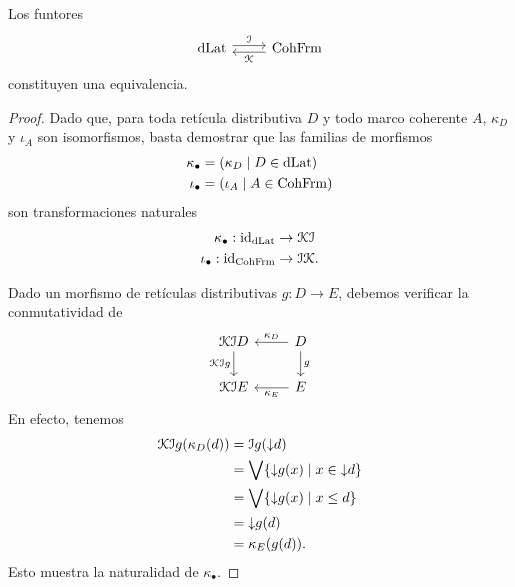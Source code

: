 \begin{theorem}
    Los funtores
    \[
        \begin{tikzcd}
            \DLat \ar[r,"\cal I",shift left] &
            \CohFrm \ar[l,"\cal K",shift left]
        \end{tikzcd}
    \]
    constituyen una equivalencia.
\end{theorem}
\begin{proof}
    Dado que, para toda retícula distributiva $D$
    y todo marco coherente $A$,  $\kappa_D$ y $\iota_A$
    son isomorfismos, basta demostrar que las familias
    de morfismos
    \begin{align*}
        \kappa_\bullet &= (\kappa_D\mid D\in\mathrm{dLat}) \\
        \iota_\bullet &= (\iota_A\mid A\in\mathrm{CohFrm})
    \end{align*}
    son transformaciones naturales
    \begin{align*}
        \kappa_\bullet:\mathrm{id}_{\mathrm{dLat}} &\to\mathcal{K}\mathcal{I} \\
        \iota_\bullet:\mathrm{id}_{\mathrm{CohFrm}} &\to\mathcal{I}\mathcal{K}.
    \end{align*}
    
    Dado un morfismo de retículas distributivas
    $g:D\to E$, debemos verificar la conmutatividad de
    \[
        \begin{tikzcd}
            \cal K\cal ID \ar[d,"\cal K\cal I g"']
                & D \ar[l,"\kappa_D"'] \ar[d,"g"] \\
            \cal K\cal IE
                & E \ar[l,"\kappa_E"]
        \end{tikzcd}
    \]
    En efecto, tenemos
    \begin{align*}
        \mathcal{K}\mathcal{I}g(\kappa_D(d))
        &= \mathcal{I}g({\downarrow} d) \\
        &= \bigvee\{{\downarrow} g(x)\mid x\in{\downarrow} d\} \\
        &= \bigvee\{{\downarrow} g(x)\mid x\leq d\} \\
        &= {\downarrow} g(d) \\
        &= \kappa_E(g(d)).
    \end{align*}
    Esto muestra la naturalidad de $\kappa_\bullet$.
    

\end{proof}
